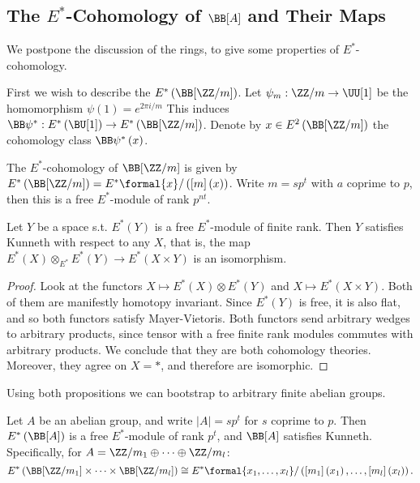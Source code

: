 \subsection{The \texorpdfstring{$E^*$}{E*}-Cohomology of \texorpdfstring{$\BB[A]$}{BA} and Their Maps}

We postpone the discussion of the rings, to give some properties of $E^*$-cohomology.

First we wish to describe the $E^*\left(\BB[\ZZ/m]\right)$.
Let $\psi_m: \ZZ/m \to \UU[1]$ be the homomorphism $\psi\left(1\right) = e^{2\pi i/m}$
This induces $\BB\psi^*: E^*\left(\BU[1]\right) \to E^*\left(\BB[\ZZ/m]\right)$.
Denote by $x \in E^2\left(\BB[\ZZ/m]\right)$ the cohomology class $\BB\psi^*\left(x\right)$.

\begin{proposition}
	The $E^*$-cohomology of $\BB[\ZZ/m]$ is given by $E^*\left(\BB[\ZZ/m]\right) = E^*\formal{x} / \left(\left[m\right]\left(x\right)\right)$.
	Write $m = sp^t$ with $a$ coprime to $p$, then this is a free $E^*$-module of rank $p^{nt}$.
\end{proposition}

\begin{proposition}
	Let $Y$ be a space s.t. $E^*\left(Y\right)$ is a free $E^*$-module of finite rank.
	Then $Y$ satisfies Kunneth with respect to any $X$, that is, the map $E^*\left(X\right) \otimes_{E^*} E^*\left(Y\right) \to E^*\left(X \times Y\right)$ is an isomorphism.
\end{proposition}

\begin{proof}
	Look at the functors $X \mapsto E^*\left(X\right) \otimes E^*\left(Y\right)$ and $X \mapsto E^*\left(X \times Y\right)$.
	Both of them are manifestly homotopy invariant.
	Since $E^*\left(Y\right)$ is free, it is also flat, and so both functors satisfy Mayer-Vietoris.
	Both functors send arbitrary wedges to arbitrary products, since tensor with a free finite rank modules commutes with arbitrary products.
	We conclude that they are both cohomology theories.
	Moreover, they agree on $X = *$, and therefore are isomorphic.
\end{proof}

Using both propositions we can bootstrap to arbitrary finite abelian groups.

\begin{proposition}\label{E-B-abelian}
	Let $A$ be an abelian group, and write $\left|A\right| = sp^t$ for $s$ coprime to $p$.
	Then $E^*\left(\BB[A]\right)$ is a free $E^*$-module of rank $p^t$, and $\BB[A]$ satisfies Kunneth.
	Specifically, for $A = \ZZ/m_1 \oplus \cdots \oplus \ZZ/m_l$:
	$$
	E^*\left(\BB[\ZZ/m_1] \times \cdots \times \BB[\ZZ/m_l]\right)
	\cong E^*\formal{x_1, \dotsc, x_l}/\left(\left[m_1\right]\left(x_1\right), \dotsc, \left[m_l\right]\left(x_l\right)\right).
	$$
\end{proposition}

